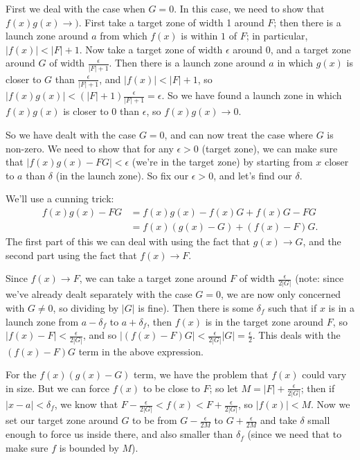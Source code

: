 \documentclass{article}
\begin{document}
First we deal with the case when $G=0$. In this case, we need to show that $f(x)g(x)\to )$. First take a target zone of width 1 around $F$; then there is a launch zone around $a$ from which $f(x)$ is within $1$ of $F$; in particular, $|f(x)|< |F|+1$. Now take a target zone of width $\epsilon$ around $0$, and a target zone around $G$ of width $\frac{\epsilon}{|F|+1}$. Then there is a launch zone around $a$ in which $g(x)$ is closer to $G$ than $\frac{\epsilon}{|F|+1}$, and $|f(x)|<|F|+1$, so $|f(x)g(x)|<(|F|+1)\frac{\epsilon}{|F|+1}=\epsilon$. So we have found a launch zone in which $f(x)g(x)$ is closer to 0 than $\epsilon$, so $f(x)g(x)\to 0$.\medskip

So we have dealt with the case $G=0$, and can now treat the case where $G$ is non-zero. We need to show that for any $\epsilon>0$ (target zone), we can make sure that $|f(x)g(x)-FG|<\epsilon$ (we're in the target zone) by starting from $x$ closer to $a$ than $\delta$ (in the launch zone). So fix our $\epsilon>0$, and let's find our $\delta$.

We'll use a cunning trick:
\begin{align*}
	f(x)g(x)-FG&=f(x)g(x)-f(x)G+f(x)G-FG\\
	&= f(x)(g(x)-G)+(f(x)-F)G.
\end{align*}
The first part of this we can deal with using the fact that $g(x)\to G$, and the second part using the fact that $f(x)\to F$.


Since $f(x)\to F$, we can take a target zone around $F$ of width $\frac{\epsilon}{2|G|}$ (note: since we've already dealt separately with the case $G=0$, we are now only concerned with $G\neq 0$, so dividing by $|G|$ is fine). Then there is some $\delta_f$ such that if $x$ is in a launch zone from $a-\delta_f$ to $a+\delta_f$, then $f(x)$ is in the target zone around $F$, so $|f(x)-F|<\frac{\epsilon}{2|G|}$, and so $|(f(x)-F)G|<\frac{\epsilon}{2|G|}|G|=\frac{\epsilon}{2}$. This deals with the $(f(x)-F)G$ term in the above expression.

For the $f(x)(g(x)-G)$ term, we have the problem that $f(x)$ could vary in size. But we can force $f(x)$ to be close to $F$; so let $M=|F|+\frac{\epsilon}{2|G|}$; then if $|x-a|<\delta_f$, we know that $F-\frac{\epsilon}{2|G|}<f(x)<F+\frac{\epsilon}{2|G|}$, so $|f(x)|<M$. Now we set our target zone around $G$ to be from $G-\frac{\epsilon}{2M}$ to $G+\frac{\epsilon}{2M}$ and take $\delta$ small enough to force us inside there, and also smaller than $\delta_f$ (since we need that to make sure $f$ is bounded by $M$).
\end{document}
